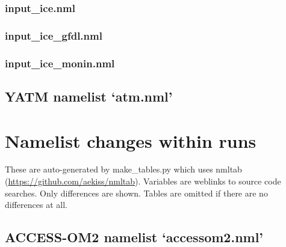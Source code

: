 \documentclass[11pt]{article}
\makeatletter
\newcommand*{\make@hex@label}[1]{%
  \def\hex@label{#1}%
  \@onelevel@sanitize\hex@label
  \EdefEscapeHex\hex@label{\hex@label}%
}
\newcommand*{\hexhypertarget}[2]{%
  \@bsphack
    \make@hex@label{#1}%
    \hypertarget{\hex@label}{#2}%
  \@esphack
}
\newcommand{\nmldiffer}[1]{#1} %
\newcommand{\nmllink}[2]{#1} %
\newcommand{\nml}[1]{{\footnotesize\textsf{}}}
\makeatother
\begin{document}
\subsubsection{input\_ice.nml}
\nml{input_ice_nml.tex}
\subsubsection{input\_ice\_gfdl.nml}
\nml{input_ice_gfdl_nml.tex}
\subsubsection{input\_ice\_monin.nml}
\nml{input_ice_monin_nml.tex}

\subsection{YATM namelist `atm.nml'}\label{S:yatm-namelist}
\renewcommand{\nmllink}[2]{\hexhypertarget{yatm:#2}{\href{https://github.com/OceansAus/libaccessom2/search?q=#2}{#1}}} %
\nml{atm_nml.tex}


\section{Namelist changes within runs}\label{S:namelist-diffs}
These are auto-generated by make\_tables.py which uses nmltab (\url{https://github.com/aekiss/nmltab}).
Variables are weblinks to source code searches. 
Only differences are shown. 
Tables are omitted if there are no differences at all.
\renewcommand{\nmldiffer}[1]{#1} %

\subsection{ACCESS-OM2 namelist `accessom2.nml'}\label{S:accessom2-namelist-diff}
\renewcommand{\nmllink}[2]{\href{https://github.com/OceansAus/libaccessom2/search?q=#2}{#1}} %
\nml{accessom2_nml_1deg_jra55v13_iaf_spinup1_A_diff.tex}
\nml{accessom2_nml_025deg_jra55v13_iaf_gmredi_diff.tex}
\nml{accessom2_nml_01deg_jra55v13_iaf_diff.tex}
\end{document}
